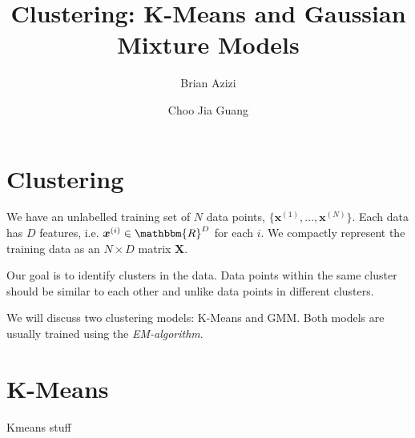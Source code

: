 \documentclass[final,3p,times]{elsarticle}
\begin{document}
\begin{frontmatter}



\title{Clustering: K-Means and Gaussian Mixture Models}


\author{Brian Azizi}
\author{Choo Jia Guang}

\address{Cavendish Laboratory, Department of Physics, J J Thomson
  Avenue, Cambridge. CB3 0HE}

\end{frontmatter}


\section*{Clustering}
\label{sect:Clustering}
We have an unlabelled training set of $N$ data points, $\{\boldsymbol{x}^{(1)}, \dots , \boldsymbol{x}^{(N)} \}$. Each data has $D$ features, i.e. $\boldsymbol{x}^{(i)} \in \mathbbm{R}^D$ for each $i$. We compactly represent the training data as an $N \times D$ matrix $\boldsymbol{X}$.

Our goal is to identify clusters in the data. Data points within the same cluster should be similar to each other and unlike data points in different clusters.

We will discuss two clustering models: K-Means and GMM.
Both models are usually trained using the \emph{EM-algorithm}.

\section{K-Means}
\label{sect:Kmeans}
Kmeans stuff
\end{document}
